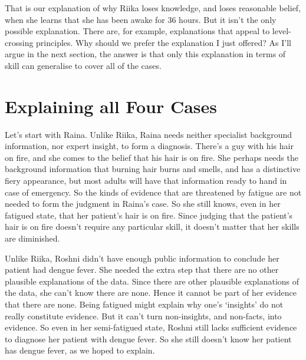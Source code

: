 That is our explanation of why \gls{Riika} loses knowledge, and loses reasonable belief, when she learns that she has been awake for 36 hours. But it isn't the only possible explanation. There are, for example, explanations that appeal to level-crossing principles. Why should we prefer the explanation I just offered? As I'll argue in the next section, the answer is that only this explanation in terms of skill can generalise to cover all of the cases.

\section{Explaining all Four Cases}
\label{explainingallfourcases}

Let's start with Raina. Unlike \gls{Riika}, Raina needs neither specialist background information, nor expert insight, to form a diagnosis. There's a guy with his hair on fire, and she comes to the belief that his hair is on fire. She perhaps needs the background information that burning hair burns and smells, and has a distinctive fiery appearance, but most adults will have that information ready to hand in case of emergency. So the kinds of evidence that are threatened by fatigue are not needed to form the judgment in Raina's case. So she still knows, even in her fatigued state, that her patient's hair is on fire. Since judging that the patient's hair is on fire doesn't require any particular skill, it doesn't matter that her skills are diminished.

Unlike \gls{Riika}, \gls{Roshni} didn't have enough public information to conclude her patient had dengue fever. She needed the extra step that there are no other plausible explanations of the data. Since there are other plausible explanations of the data, she can't know there are none. Hence it cannot be part of her evidence that there are none. Being fatigued might explain why one's `insights' do not really constitute evidence. But it can't turn non-insights, and non-facts, into evidence. So even in her semi-fatigued state, \gls{Roshni} still lacks sufficient evidence to diagnose her patient with dengue fever. So she still doesn't know her patient has dengue fever, as we hoped to explain.

